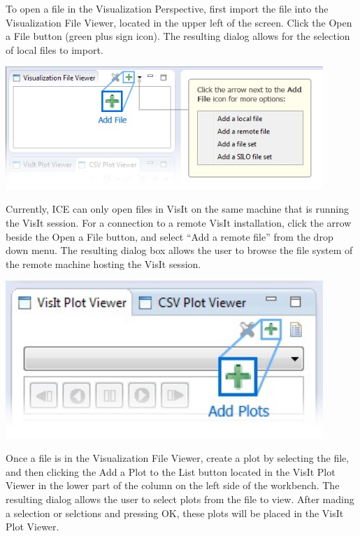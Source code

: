 \documentclass{article}
\begin{document}
To open a file in the Visualization Perspective, first import the file into the
Visualization File Viewer, located in the upper left of the screen. Click the
Open a File button (green plus sign icon). The resulting dialog allows for the
selection of local files to import.

\begin{center}
\includegraphics[width=12cm]{images/VisualizationAddFile}
\end{center}

Currently, ICE can only open files in VisIt on the same machine that is running
the VisIt session. For a connection to a remote VisIt installation, click the
arrow beside the Open a File button, and select ``Add a remote file'' from the
drop down menu. The resulting dialog box allows the user to browse the file
system of the remote machine hosting the VisIt session.

\begin{center}
\includegraphics[width=12cm]{images/VisualizationAddPlots}
\end{center}

Once a file is in the Visualization File Viewer, create a plot by selecting the
file, and then clicking the Add a Plot to the List button located in the VisIt
Plot Viewer in the lower part of the column on the left side of the workbench.
The resulting dialog allows the user to select plots from the file to view.
After mading a selection or selctions and pressing OK, these plots will be
placed in the VisIt Plot Viewer.
\end{document}
